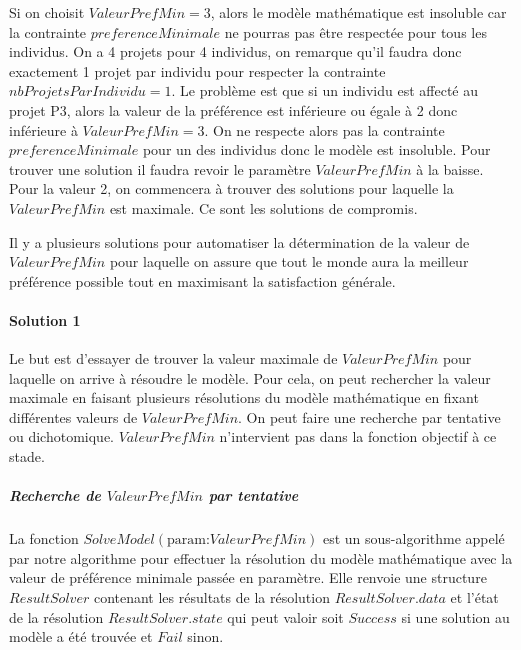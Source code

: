 \documentclass[final,poster]{polytech/polytech}
\begin{document}
Si on choisit $ValeurPrefMin=3$, alors le modèle mathématique est insoluble car la contrainte $preferenceMinimale$ ne pourras pas être respectée pour tous les individus. On a 4 projets pour 4 individus, on remarque qu'il faudra donc exactement 1 projet par individu pour respecter la contrainte $nbProjetsParIndividu=1$. Le problème est que si un individu est affecté au projet P3, alors la valeur de la préférence est inférieure ou égale à 2 donc inférieure à $ValeurPrefMin=3$. On ne respecte alors pas la contrainte $preferenceMinimale$ pour un des individus donc le modèle est insoluble.
Pour trouver une solution il faudra revoir le paramètre $ValeurPrefMin$ à la baisse. Pour la valeur 2, on commencera à trouver des solutions pour laquelle la $ValeurPrefMin$ est maximale. Ce sont les solutions de compromis.

Il y a plusieurs solutions pour automatiser la détermination de la valeur de $ValeurPrefMin$ pour laquelle on assure que tout le monde aura la meilleur préférence possible tout en maximisant la satisfaction générale.

\paragraph{Solution 1}
Le but est d'essayer de trouver la valeur maximale de $ValeurPrefMin$ pour laquelle on arrive à résoudre le modèle. Pour cela, on peut rechercher la valeur maximale en faisant plusieurs résolutions du modèle mathématique en fixant différentes valeurs de $ValeurPrefMin$. On peut faire une recherche par tentative ou dichotomique. $ValeurPrefMin$ n'intervient pas dans la fonction objectif à ce stade.

\subparagraph{Recherche de $ValeurPrefMin$ par tentative}

La fonction $SolveModel(\text{param:} ValeurPrefMin)$ est un sous-algorithme appelé par notre algorithme pour effectuer la résolution du modèle mathématique avec la valeur de préférence minimale passée en paramètre.
Elle renvoie une structure $ResultSolver$ contenant les résultats de la résolution $ResultSolver.data$ et l'état de la résolution $ResultSolver.state$ qui peut valoir soit $Success$ si une solution au modèle a été trouvée et $Fail$ sinon.
\end{document}
